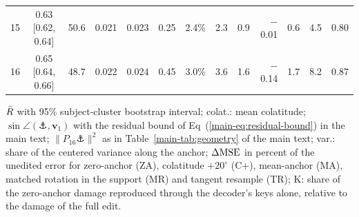 \begin{table}[p]
\begin{tabular}{rcccccrrrrrrr}
15 & 0.63 [0.62, 0.64] & 50.6 & 0.021 & 0.023 & 0.25 & 2.4\% & 2.3 & 0.9 & $-$0.01 & 0.6 & 4.5 & 0.80 \\
16 & 0.65 [0.64, 0.66] & 48.7 & 0.022 & 0.024 & 0.45 & 3.0\% & 3.6 & 1.6 & $-$0.14 & 1.7 & 8.2 & 0.87 \\
\bottomrule
\end{tabular}
\begin{flushleft}\footnotesize $\bar{R}$ with 95\% subject-cluster bootstrap interval; colat.: mean colatitude; $\sin\angle(\anchor,\bm{v}_1)$ with the residual bound of Eq~(\ref{main-eq:residual-bound}) in the main text; $\|P_{16}\anchor\|^2$ as in Table~\ref{main-tab:geometry} of the main text; var.: share of the centered variance along the anchor; $\Delta\mathrm{MSE}$ in percent of the unedited error for zero-anchor (ZA), colatitude $+20^\circ$ (C+), mean-anchor (MA), matched rotation in the support (MR) and tangent resample (TR); K: share of the zero-anchor damage reproduced through the decoder's keys alone, relative to the damage of the full edit.\end{flushleft}
\end{table}

